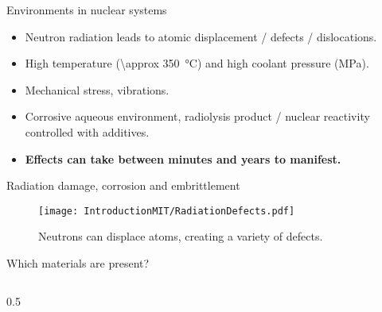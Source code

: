 
\separatorcolumn

\begin{column}{\colwidth}

    \begin{exampleblock}{Environments in nuclear systems}


        \begin{itemize}
            \setlength\itemsep{1em}
            \item Neutron radiation leads to atomic displacement / defects / dislocations.
            \item High temperature (\qty{\approx 350}{\degreeCelsius}) and high coolant pressure (\unit{\mega\pascal}).
            \item Mechanical stress, vibrations.
            \item Corrosive aqueous environment, radiolysis product / nuclear reactivity controlled with additives.
            \item \textbf{Effects can take between minutes and years to manifest.}
        \end{itemize}

    \end{exampleblock}

    \begin{block}{Radiation damage, corrosion and embrittlement}

        \begin{figure}
            \centering
            \texttt{[image: IntroductionMIT/RadiationDefects.pdf]}
            \caption{Neutrons can displace atoms, creating a variety of defects.}
            \label{fig:DefectsLattice}
        \end{figure}

    \end{block}

    \begin{block}{Which materials are present?}

        \begin{columns}[T]
            \begin{column}{0.5\colwidth}


\end{column}
\end{columns}
\end{block}
\end{column}
